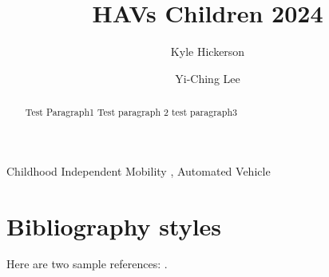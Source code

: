 \documentclass[review, 3p,
authoryear]{elsarticle} %
\begin{document}
\begin{frontmatter}

  \title{HAVs Children 2024}
    \author[GMU]{Kyle Hickerson%
  }
    \author[GMU]{Yi-Ching Lee%
  }
  
  \begin{abstract}
  Test Paragraph1 Test paragraph 2 test paragraph3
  \end{abstract}
    \begin{keyword}
    Childhood Independent Mobility \sep 
    Automated Vehicle
  \end{keyword}
  
 \end{frontmatter}

\hypertarget{bibliography-styles}{%
\section{Bibliography styles}\label{bibliography-styles}}

Here are two sample references:
\citeauthor{bennettsWhatInfluencesParents2018}
\citetext{\citeyear{bennettsWhatInfluencesParents2018}; \citealp{williamsMethodVarianceMarker2010}}.

\renewcommand\refname{References}

\end{document}

